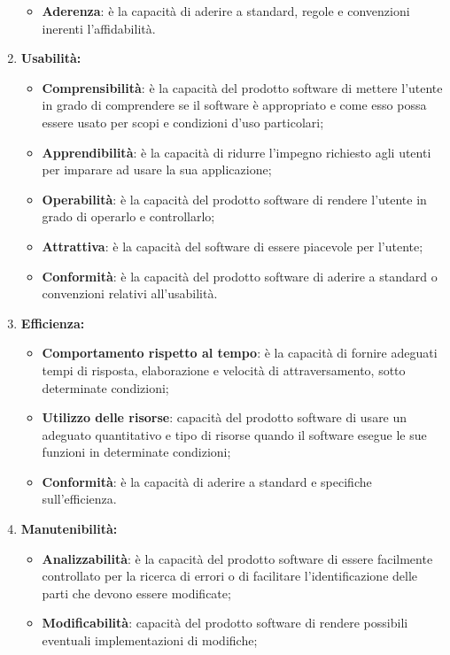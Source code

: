 \begin{enumerate}
\begin{itemize}
      \item \textbf{Aderenza}: è la capacità di aderire a standard, regole e convenzioni inerenti l'affidabilità.
    \end{itemize}
    \item \textbf{Usabilità:}
    \begin{itemize}
      \item \textbf{Comprensibilità}: è la capacità del prodotto software di mettere l'utente in grado di comprendere se il software è appropriato e come esso possa essere usato per scopi e condizioni d'uso particolari;
      \item \textbf{Apprendibilità}: è la capacità di ridurre l'impegno richiesto agli utenti per imparare ad usare la sua applicazione;
      \item \textbf{Operabilità}: è la capacità del prodotto software di rendere l'utente in grado di operarlo e controllarlo;
      \item \textbf{Attrattiva}: è la capacità del software di essere piacevole per l'utente;
      \item \textbf{Conformità}: è la capacità del prodotto software di aderire a standard o convenzioni relativi all'usabilità.
    \end{itemize}
    \item \textbf{Efficienza:}
    \begin{itemize}
      \item \textbf{Comportamento rispetto al tempo}: è la capacità di fornire adeguati tempi di risposta, elaborazione e velocità di attraversamento, sotto determinate condizioni;
      \item \textbf{Utilizzo delle risorse}: capacità del prodotto software di usare un adeguato quantitativo e tipo di risorse quando il software esegue le sue funzioni in determinate condizioni;
      \item \textbf{Conformità}: è la capacità di aderire a standard e specifiche sull'efficienza.
    \end{itemize}
    \item \textbf{Manutenibilità:}
    \begin{itemize}
      \item \textbf{Analizzabilità}: è la capacità del prodotto software di essere facilmente controllato per la ricerca di errori o di facilitare l'identificazione delle parti che devono essere modificate;
      \item \textbf{Modificabilità}: capacità del prodotto software di rendere possibili eventuali implementazioni di modifiche;

\end{itemize}
\end{enumerate}
